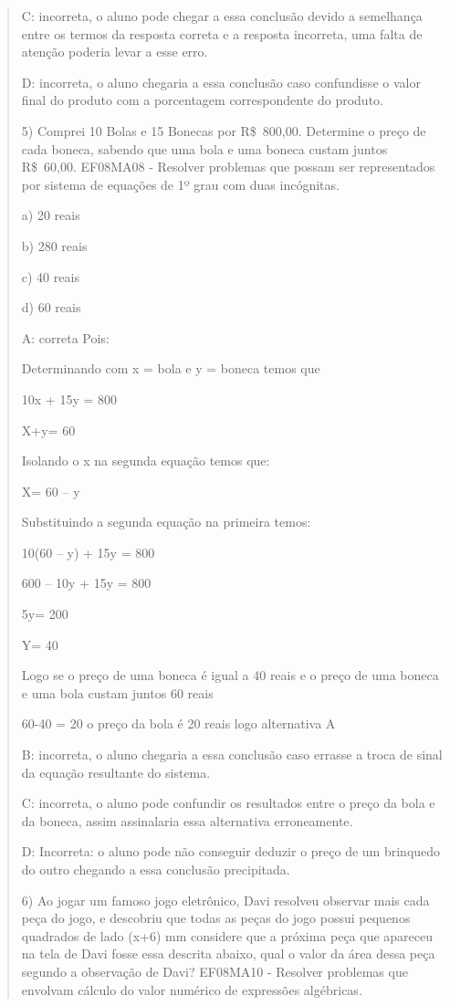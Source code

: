 \begin{quote}
\begin{escolha}
C: incorreta, o aluno pode chegar a essa conclusão devido a semelhança
entre os termos da resposta correta e a resposta incorreta, uma falta de
atenção poderia levar a esse erro.

D: incorreta, o aluno chegaria a essa conclusão caso confundisse o valor
final do produto com a porcentagem correspondente do produto.

5) Comprei 10 Bolas e 15 Bonecas por R\$~800,00. Determine o preço de
cada boneca, sabendo que uma bola e uma boneca custam juntos R\$~60,00.
EF08MA08 - Resolver problemas que possam ser representados por sistema
de equações de 1º grau com duas incógnitas.

a) 20 reais

b) 280 reais

c) 40 reais

d) 60 reais

A: correta Pois:

Determinando com x = bola e y = boneca temos que

10x + 15y = 800

X+y= 60

Isolando o x na segunda equação temos que:

X= 60 -- y

Substituindo a segunda equação na primeira temos:

10(60 -- y) + 15y = 800

600 -- 10y + 15y = 800

5y= 200

Y= 40

Logo se o preço de uma boneca é igual a 40 reais e o preço de uma boneca
e uma bola custam juntos 60 reais

60-40 = 20 o preço da bola é 20 reais logo alternativa A

B: incorreta, o aluno chegaria a essa conclusão caso errasse a troca de
sinal da equação resultante do sistema.

C: incorreta, o aluno pode confundir os resultados entre o preço da bola
e da boneca, assim assinalaria essa alternativa erroneamente.

D: Incorreta: o aluno pode não conseguir deduzir o preço de um brinquedo
do outro chegando a essa conclusão precipitada.

6) Ao jogar um famoso jogo eletrônico, Davi resolveu observar mais cada
peça do jogo, e descobriu que todas as peças do jogo possui pequenos
quadrados de lado (x+6) mm considere que a próxima peça que apareceu na
tela de Davi fosse essa descrita abaixo, qual o valor da área dessa peça
segundo a observação de Davi? EF08MA10 - Resolver problemas que envolvam
cálculo do valor numérico de expressões algébricas.


\end{escolha}
\end{quote}
